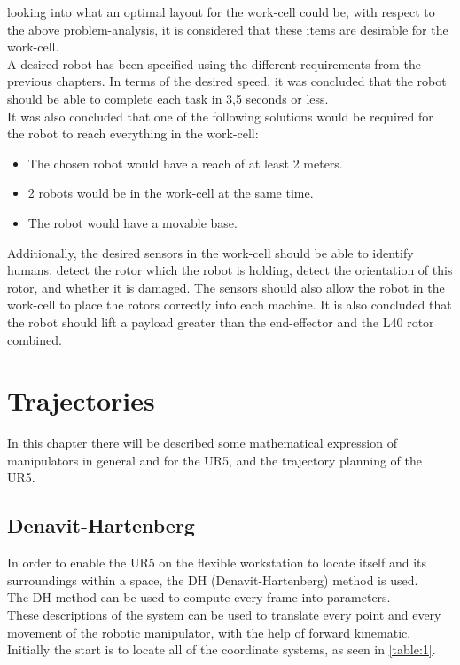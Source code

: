 looking into what an optimal layout for the work-cell could be, with respect to the above problem-analysis, it is considered that these items are desirable for the work-cell.\\
A desired robot has been specified using the different requirements from the previous chapters. In terms of the desired speed, it was concluded that the robot should be able to complete each task in 3,5 seconds or less.\\
It was also concluded that one of the following solutions would be required for the robot to reach everything in the work-cell: 
\begin{itemize}
    \item The chosen robot would have a reach of at least 2 meters.
    \item 2 robots would be in the work-cell at the same time. 
    \item The robot would have a movable base. 
\end{itemize} 
Additionally, the desired sensors in the work-cell should be able to identify humans, detect the rotor which the robot is holding, detect the orientation of this rotor, and whether it is damaged. The sensors should also allow the robot in the work-cell to place the rotors correctly into each machine. It is also concluded that the robot should lift a payload greater than the end-effector and the L40 rotor combined.\\

\chapter{Trajectories}\label{ch:kinematics}

In this chapter there will be described some mathematical expression of manipulators in general and for the UR5, and the trajectory planning of the UR5.

\section{Denavit-Hartenberg}

In order to enable the UR5 on the flexible workstation to locate itself and its surroundings within a space, the DH (Denavit-Hartenberg) method is used.\\ 
The DH method can be used to compute every frame into parameters.\\
These descriptions of the system can be used to translate every point and every movement of the robotic manipulator, with the help of forward kinematic.\\
Initially the start is to locate all of the coordinate systems, as seen in \ref{table:1}.\\ 


